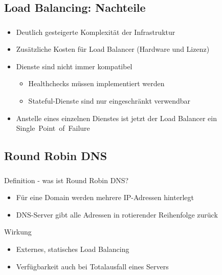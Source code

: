 \subsection{Load Balancing: Nachteile}
\begin{frame}
    \frametitle{\insertsection}
    \framesubtitle{\insertsubsection}

    \begin{itemize}
    	\item Deutlich gesteigerte Komplexität der Infrastruktur
    	\item Zusätzliche Kosten für Load Balancer (Hardware und Lizenz)%
    	\item Dienste sind nicht immer kompatibel
		\begin{itemize}
			\item Healthchecks müssen implementiert werden
			\item Stateful-Dienste sind nur eingeschränkt verwendbar
		\end{itemize}
    	\item Anstelle eines einzelnen Dienstes ist jetzt der Load Balancer ein Single~Point~of~Failure
    \end{itemize}
\end{frame}

\subsection{Round Robin DNS}
\begin{frame}
    \frametitle{\insertsection}
    \framesubtitle{\insertsubsection}
    \begin{block}{Definition - was ist Round Robin DNS?}
    \begin{itemize}
        \item Für eine Domain werden mehrere IP-Adressen hinterlegt
        \item DNS-Server gibt alle Adressen in rotierender Reihenfolge zurück


    \end{itemize}
    \end{block}
    \begin{block}{Wirkung}
    	\begin{itemize}
    		\item Externes, statisches Load Balancing
    		\item Verfügbarkeit auch bei Totalausfall eines Servers
    	\end{itemize}
    \end{block}
\end{frame}


